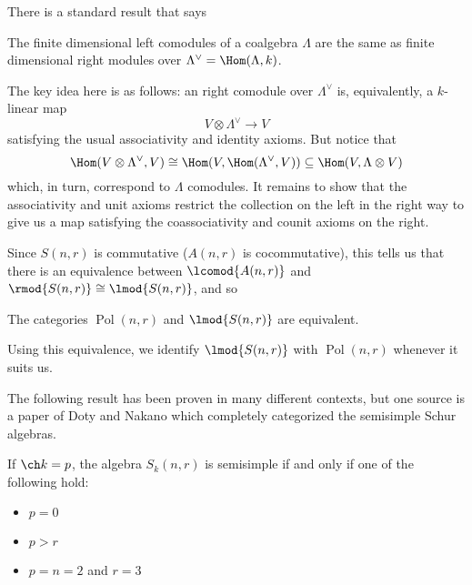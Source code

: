 \documentclass[12pt]{article}
\DeclareMathOperator{\Pol}{Pol}
\begin{document}
There is a standard result that says 
\begin{prop}
	The finite dimensional left comodules of a coalgebra $\Lambda$ are the same as finite dimensional right modules 
	over $\Lambda^\vee=\Hom(\Lambda, k)$.
\end{prop}
\begin{prf}[sketch]
	The key idea here is as follows: an right comodule over $\Lambda^\vee$ is, equivalently, a $k$-linear map 
	\[V\otimes \Lambda^\vee\to V\]
	satisfying the usual associativity and identity axioms.	But notice that 
	\[\Hom(V\otimes \Lambda^\vee,V)\cong\Hom(V,\Hom(\Lambda^\vee,V))\subseteq\Hom(V,\Lambda\otimes V)\]
	which, in turn, correspond to $\Lambda$ comodules. It remains to show that the associativity and unit axioms restrict 
	the collection on the left in the right way to give us a map satisfying the coassociativity and counit axioms on the right.
\end{prf}

Since $S(n,r)$ is commutative ($A(n,r)$ is cocommutative), this tells us that there is an equivalence between $\lcomod{A(n,r)}$ and $\rmod{S(n,r)}\cong\lmod{S(n,r)}$, and so 
\begin{cor}
	The categories $\Pol(n,r)$ and $\lmod{S(n,r)}$ are equivalent.
\end{cor}
\begin{rmk}
	Using this equivalence, we identify $\lmod{S(n,r)}$ with $\Pol(n,r)$ whenever it suits us.
\end{rmk}

The following result has been proven in many different contexts, but one source is a paper of Doty and Nakano which completely 
categorized the semisimple Schur algebras.
\begin{cor}\label{cor:semisimple}
	If $\ch k=p$, the algebra $S_k(n,r)$ is semisimple if and only if one of the following hold:
	\begin{itemize}
		\item $p=0$
		\item $p>r$
		\item $p=n=2$ and $r=3$
	\end{itemize}
\end{cor}
\end{document}
